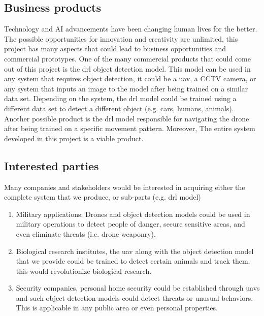 \documentclass[../main.tex]{subfiles}
\begin{document}
\subsection{Business products}
	Technology and AI advancements have been changing human lives for the better.
	The possible opportunities for innovation and creativity are unlimited, this
	project has many aspects that could lead to business opportunities and commercial
	prototypes. 
	One of the many commercial products that could come out of this project is
	the \gls{drl} object detection model. This model can be used in any system
	that requires object detection, it could be a \gls{uav}, a CCTV camera, or
	any system that inputs an image to the model after being trained on a similar 
	data set.
	Depending on the system, the \gls{drl} model could be trained using a different
	data set to detect a different object (e.g. cars, humans, animals).
	Another possible product is the \gls{drl} model responsible for navigating the
	drone after being trained on a specific movement pattern.
	Moreover, The entire system developed in this project is a viable product.

\subsection{Interested parties}
	Many companies and stakeholders would be interested in acquiring either the
	complete system that we produce, or sub-parts (e.g. \gls{drl} model)
	\begin{enumerate}
		\item Military applications: Drones and object detection models could 
		be used in military operations to detect people of danger, secure 
		sensitive areas, and even eliminate threats (i.e. drone weaponry).
		
		\item Biological research institutes, the \gls{uav} along with the object detection model that we provide could be trained to detect certain animals and track them,
		this would revolutionize biological research.
		
		\item Security companies, personal home security could be established through
		\glspl{uav} and such object detection models could detect threats or unusual behaviors. This is applicable in any public area or even personal properties.		
		
	\end{enumerate}
\end{document}
